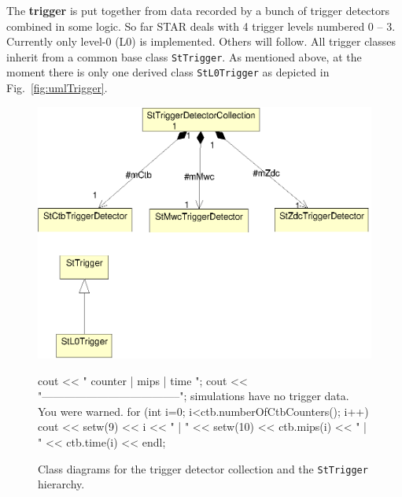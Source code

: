 \documentclass[twoside]{article}
\begin{document}
The \textbf{trigger} is put together from data recorded by a bunch of
trigger detectors combined in some logic. So far STAR deals with 4
trigger levels numbered 0 -- 3.  Currently only level-0 (L0) is
implemented. Others will follow.  All trigger classes inherit from a
common base class \texttt{StTrigger}.  As mentioned above, at the
moment there is only one derived class \texttt{StL0Trigger} as
depicted in Fig.~\ref{fig:umlTrigger}.
\begin{figure}[htb]
    \begin{center}
        \includegraphics{trigger.eps}
        \caption{Class diagrams for the trigger detector collection and
            the \texttt{StTrigger} hierarchy.}
    cout << "  counter  |     mips    |     time   \n";
    cout << "--------------------------------------\n";
simulations have no trigger data. You were warned.
    for (int i=0; i<ctb.numberOfCtbCounters(); i++) {
        cout << setw(9) << i <<   "  | "
             << setw(10) << ctb.mips(i) << "  | "
             << ctb.time(i) << endl;
    }


\end{center}
\end{figure}
\end{document}
